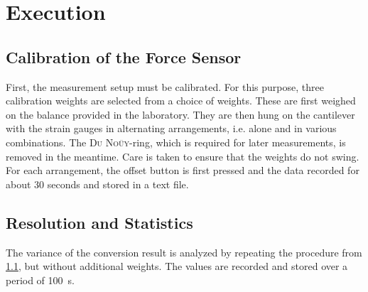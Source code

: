 \chapter{Execution}
    \section{Calibration of the Force Sensor} \label{sec:Calibration}
        First, the measurement setup must be calibrated. For this purpose, three calibration weights are selected from a choice
        of weights. These are first weighed on the balance provided in the laboratory. They are then hung on the cantilever with
        the strain gauges in alternating arrangements, i.e. alone and in various combinations. The \textsc{Du Noüy}-ring, which
        is required for later measurements, is removed in the meantime. Care is taken to ensure that the weights do not swing.
        For each arrangement, the offset button is first pressed and the data recorded for about \(30\) seconds and stored in a text
        file.
    \section{Resolution and Statistics} \label{sec:Statistics}
        The variance of the conversion result is analyzed by repeating the procedure from \cref{sec:Calibration}, but without
        additional weights. The values are recorded and stored over a period of \SI{100}{s}.
